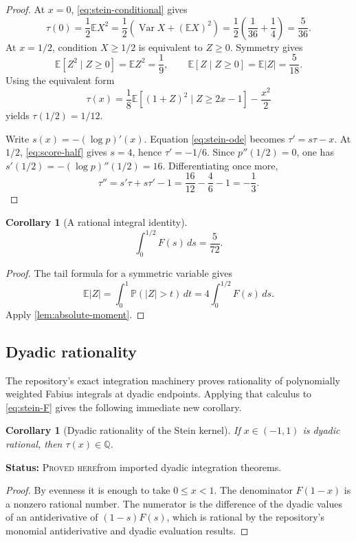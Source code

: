 \documentclass[11pt,oneside]{article}
\newtheorem{corollary}[theorem]{Corollary}
\theoremstyle{definition}
\theoremstyle{remark}
\newcommand{\Var}{\operatorname{Var}}
\newcommand{\E}{\mathbb E}
\newcommand{\Prob}{\mathbb P}
\newcommand{\Pp}{\Prob}
\newcommand{\ProvedHere}{\textcolor{statusgreen}{\textsc{Proved here}}}
\newcommand{\Status}[1]{\par\smallskip\noindent\textbf{Status:} #1.\par\smallskip}
\begin{document}
\begin{proof}
At $x=0$, \eqref{eq:stein-conditional} gives
\[
 \tau(0)=\frac12\E X^2
 =\frac12\left(\Var X+(\E X)^2\right)
 =\frac12\left(\frac1{36}+\frac14\right)=\frac5{36}.
\]
At $x=1/2$, condition $X\ge1/2$ is equivalent to $Z\ge0$.  Symmetry gives
\[
 \E[Z^2\mid Z\ge0]=\E Z^2=\frac19,
 \qquad \E[Z\mid Z\ge0]=\E|Z|=\frac5{18}.
\]
Using the equivalent form
\[
 \tau(x)=\frac18\E[(1+Z)^2\mid Z\ge2x-1]-\frac{x^2}{2}
\]
yields $\tau(1/2)=1/12$.

Write $s(x)=-(\log p)'(x)$.  Equation \eqref{eq:stein-ode} becomes
$\tau'=s\tau-x$.  At $1/2$, \eqref{eq:score-half} gives $s=4$, hence
$\tau'=-1/6$.  Since $p''(1/2)=0$, one has
$s'(1/2)=-(\log p)''(1/2)=16$.  Differentiating once more,
\[
 \tau''=s'\tau+s\tau'-1
 =\frac{16}{12}-\frac{4}{6}-1=-\frac13.
\]
\end{proof}

\begin{corollary}[A rational integral identity]
\begin{equation}
 \int_0^{1/2}F(s)\,ds=\frac5{72}.
\end{equation}
\end{corollary}

\begin{proof}
The tail formula for a symmetric variable gives
\[
 \E|Z|=\int_0^1\Pp(|Z|>t)\,dt
 =4\int_0^{1/2}F(s)\,ds.
\]
Apply \cref{lem:absolute-moment}.
\end{proof}

\subsection{Dyadic rationality}
The repository's exact integration machinery proves rationality of polynomially
weighted Fabius integrals at dyadic endpoints.  Applying that calculus to
\eqref{eq:stein-F} gives the following immediate new corollary.

\begin{corollary}[Dyadic rationality of the Stein kernel]\label{cor:tau-dyadic}
If $x\in(-1,1)$ is dyadic rational, then $\tau(x)\in\mathbb{Q}$.
\end{corollary}
\Status{\ProvedHere from imported dyadic integration theorems}

\begin{proof}
By evenness it is enough to take $0\le x<1$.  The denominator $F(1-x)$ is a
nonzero rational number.  The numerator is the difference of the dyadic values of
an antiderivative of $(1-s)F(s)$, which is rational by the repository's monomial
antiderivative and dyadic evaluation results.
\end{proof}
\end{document}
